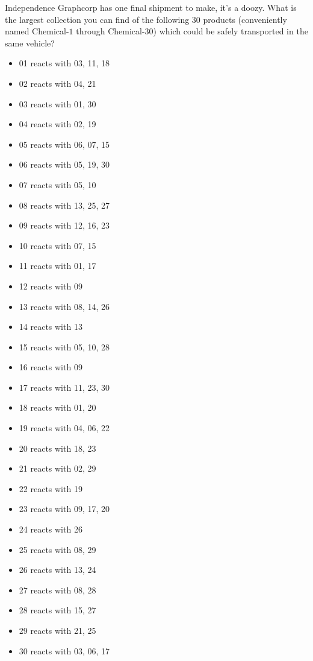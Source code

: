 \begin{extraPuzzle}
Independence Graphcorp has one final shipment to make, it's a doozy.
What is the largest collection you can find of the following 30 products
(conveniently named Chemical-\(1\) through Chemical-\(30\))
which could be safely transported in the same vehicle?

  \begin{multicols}{2}
  \begin{itemize}
    \item 01 reacts with 03, 11, 18
    \item 02 reacts with 04, 21
    \item 03 reacts with 01, 30
    \item 04 reacts with 02, 19
    \item 05 reacts with 06, 07, 15
    \item 06 reacts with 05, 19, 30
    \item 07 reacts with 05, 10
    \item 08 reacts with 13, 25, 27
    \item 09 reacts with 12, 16, 23
    \item 10 reacts with 07, 15
    \item 11 reacts with 01, 17
    \item 12 reacts with 09
    \item 13 reacts with 08, 14, 26
    \item 14 reacts with 13
    \item 15 reacts with 05, 10, 28
    \item 16 reacts with 09
    \item 17 reacts with 11, 23, 30
    \item 18 reacts with 01, 20
    \item 19 reacts with 04, 06, 22
    \item 20 reacts with 18, 23
    \item 21 reacts with 02, 29
    \item 22 reacts with 19
    \item 23 reacts with 09, 17, 20
    \item 24 reacts with 26
    \item 25 reacts with 08, 29
    \item 26 reacts with 13, 24
    \item 27 reacts with 08, 28
    \item 28 reacts with 15, 27
    \item 29 reacts with 21, 25
    \item 30 reacts with 03, 06, 17
  \end{itemize}
  \end{multicols}


\end{extraPuzzle}
